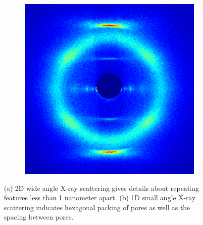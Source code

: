 \documentclass{article}
\newcommand{\angstrom}{\textup{\AA}}
\begin{document}
\begin{figure}[!ht]
\begin{subfigure}[t]{0.47\linewidth}
{                \includegraphics[width=\linewidth]{WAXS_soft_confined.png}
                }
                \caption{}\label{fig:WAXS}
        \end{subfigure}
        \caption{(a) 2D wide angle X-ray scattering gives details about repeating
        features less than 1 nanometer apart. (b) 1D small angle X-ray scattering
        indicates hexagonal packing of pores as well as the spacing between pores.}\label{fig:SWAXS}
  \end{figure}

\end{document}
